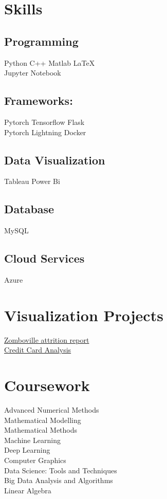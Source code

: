 \documentclass[]{deedy-resume-openfont}
\begin{document}
\hfill
\begin{minipage}[t]{0.33\textwidth} 



\section{Skills}
\subsection{Programming}
Python \textbullet{} C++ \textbullet{} Matlab \textbullet{} \LaTeX  \\
\textbullet{} Jupyter Notebook  
\subsection{Frameworks:}
Pytorch \textbullet{} Tensorflow \textbullet{} Flask\\
\textbullet{} Pytorch Lightning  \textbullet{} Docker
\subsection{Data Visualization}
Tableau \textbullet{} Power Bi 
\subsection{Database}
MySQL
\subsection{Cloud Services}
Azure
\sectionsep

\section{Visualization Projects}
\textbullet{} \href{https://github.com/Shyam-Sundar-7/hr_tableau_dashboard}{Zomboville attrition report} \\
\textbullet{}\href{https://github.com/Shyam-Sundar-7/credit-card-analysis---tableau}{Credit Card Analysis}
\sectionsep

\section{Coursework}
\textbullet{}Advanced Numerical Methods \\
\textbullet{}Mathematical Modelling \\
\textbullet{}Mathematical Methods \\
\textbullet{}Machine Learning \\\textbullet{}
Deep Learning \\\textbullet{}
Computer Graphics \\\textbullet{}
Data Science: Tools and Techniques \\\textbullet{}
Big Data Analysis and Algorithms\\\textbullet{}
Linear Algebra 
\sectionsep


\end{minipage}
\end{document}
